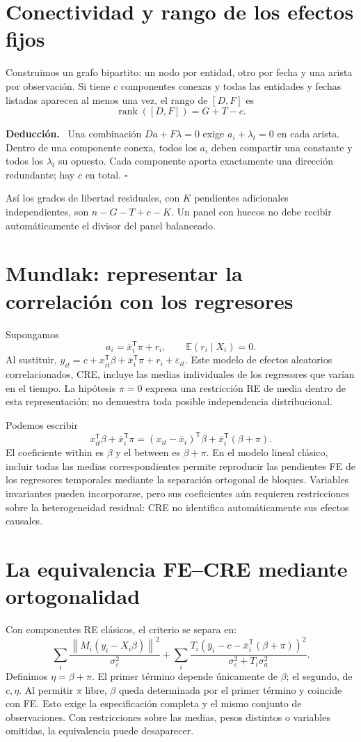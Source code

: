 \documentclass[11pt,a4paper]{article}
\newcommand{\E}{\mathbb E}
\newcommand{\T}{^{\mathsf T}}
\newcommand{\norm}[1]{\left\lVert #1\right\rVert}
\newenvironment{deduccion}{\par\textbf{Deducción.}\ }{\hfill$\square$\par}
\DeclareMathOperator{\rank}{rank}
\theoremstyle{definition}
\newcommand{\eps}{\varepsilon}
\begin{document}
\section{Conectividad y rango de los efectos fijos}
Construimos un grafo bipartito: un nodo por entidad, otro por fecha y una arista por observación. Si tiene $c$ componentes conexas y todas las entidades y fechas listadas aparecen al menos una vez, el rango de $[D,F]$ es
\[
\rank([D,F])=G+T-c.
\]
\begin{deduccion}
Una combinación $Da+F\lambda=0$ exige $a_i+\lambda_t=0$ en cada arista. Dentro de una componente conexa, todos los $a_i$ deben compartir una constante y todos los $\lambda_t$ su opuesto. Cada componente aporta exactamente una dirección redundante; hay $c$ en total.
\end{deduccion}
Así los grados de libertad residuales, con $K$ pendientes adicionales independientes, son
$n-G-T+c-K$. Un panel con huecos no debe recibir automáticamente el divisor del panel balanceado.

\section{Mundlak: representar la correlación con los regresores}
Supongamos
\[
a_i=\bar x_i\T\pi+r_i,\qquad
\E(r_i\mid X_i)=0.
\]
Al sustituir,
$y_{it}=c+x_{it}\T\beta+\bar x_i\T\pi+r_i+\eps_{it}$.
Este modelo de efectos aleatorios correlacionados, CRE, incluye las medias individuales de los regresores que varían en el tiempo.
La hipótesis $\pi=0$ expresa una restricción RE de media dentro de esta representación; no demuestra toda posible independencia distribucional.

Podemos escribir
\[
x_{it}\T\beta+\bar x_i\T\pi
=(x_{it}-\bar x_i)\T\beta+\bar x_i\T(\beta+\pi).
\]
El coeficiente within es $\beta$ y el between es $\beta+\pi$.
En el modelo lineal clásico, incluir todas las medias correspondientes permite reproducir las pendientes FE de los regresores temporales mediante la separación ortogonal de bloques.
Variables invariantes pueden incorporarse, pero sus coeficientes aún requieren restricciones sobre la heterogeneidad residual: CRE no identifica automáticamente sus efectos causales.

\section{La equivalencia FE--CRE mediante ortogonalidad}
Con componentes RE clásicos, el criterio se separa en:
\[
\sum_i\frac{\norm{M_i(y_i-X_i\beta)}^2}{\sigma_\eps^2}
+\sum_i\frac{T_i(\bar y_i-c-\bar x_i\T(\beta+\pi))^2}
{\sigma_\eps^2+T_i\sigma_a^2}.
\]
Definimos $\eta=\beta+\pi$.
El primer término depende únicamente de $\beta$; el segundo, de $c,\eta$.
Al permitir $\pi$ libre, $\beta$ queda determinada por el primer término y coincide con FE. Esto exige la especificación completa y el mismo conjunto de observaciones. Con restricciones sobre las medias, pesos distintos o variables omitidas, la equivalencia puede desaparecer.
\end{document}
